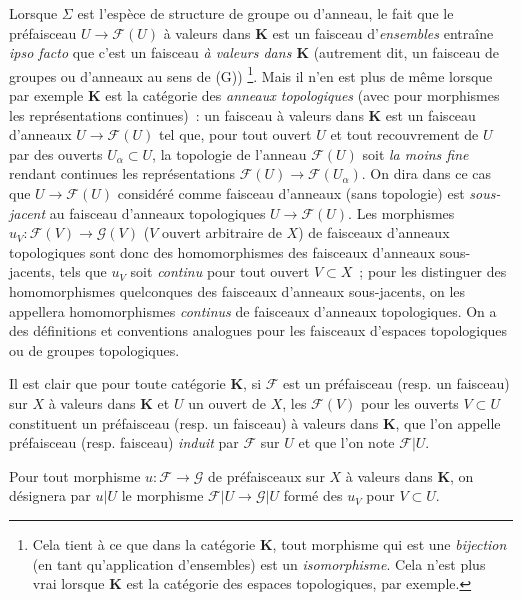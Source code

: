 \begin{env}[3.1.4]
\label{0.3.1.4-fr}
Lorsque $\Sigma$ est l'espèce de structure de groupe ou d'anneau, le fait que
le préfaisceau $U\to\mathcal{F}(U)$ à valeurs dans $\boldsymbol{K}$ est un
faisceau d'\emph{ensembles} entraîne \emph{ipso facto} que c'est un
faisceau \emph{à valeurs dans $\boldsymbol{K}$} (autrement dit, un faisceau de
groupes ou d'anneaux au sens de (G))%
\footnote{Cela tient à ce que dans la catégorie $\boldsymbol{K}$, tout morphisme
qui est une \emph{bijection} (en tant qu'application d'ensembles) est un
\emph{isomorphisme}. Cela n'est plus vrai lorsque $\boldsymbol{K}$ est la
catégorie des espaces topologiques, par exemple.}. Mais il n'en est plus de
même lorsque par exemple $\boldsymbol{K}$ est la catégorie des \emph{anneaux
topologiques} (avec pour morphismes les représentations continues)~: un
faisceau à valeurs dans $\boldsymbol{K}$ est un faisceau d'anneaux
$U\to\mathcal{F}(U)$ tel que, pour tout ouvert $U$ et tout recouvrement de $U$
par des ouverts $U_\alpha\subset U$, la topologie de l'anneau $\mathcal{F}(U)$
soit \emph{la moins fine} rendant continues les représentations
$\mathcal{F}(U)\to\mathcal{F}(U_\alpha)$. On dira dans ce cas que
$U\to\mathcal{F}(U)$ considéré comme faisceau d'anneaux (sans topologie) est
\emph{sous-jacent} au faisceau d'anneaux topologiques
$U\to\mathcal{F}(U)$. Les morphismes
$u_V:\mathcal{F}(V)\to\mathcal{G}(V)$ ($V$ ouvert arbitraire de $X$) de
faisceaux d'anneaux topologiques sont donc des homomorphismes des faisceaux
d'anneaux sous-jacents, tels que $u_V$ soit \emph{continu} pour tout ouvert
$V\subset X$~; pour les distinguer des homomorphismes quelconques des
faisceaux d'anneaux sous-jacents, on les appellera homomorphismes
\emph{continus} de faisceaux d'anneaux topologiques. On a des définitions et
conventions analogues pour les faisceaux d'espaces topologiques ou de groupes
topologiques.
\end{env}


\begin{env}[3.1.5]
\label{0.3.1.5-fr}
Il est clair que pour toute catégorie $\boldsymbol{K}$, si $\mathcal{F}$ est un
préfaisceau (resp. un faisceau) sur $X$ à valeurs dans $\boldsymbol{K}$ et $U$ un
ouvert de $X$, les $\mathcal{F}(V)$ pour les ouverts $V\subset U$ constituent
un préfaisceau (resp. un faisceau) à valeurs dans $\boldsymbol{K}$, que l'on
appelle préfaisceau (resp. faisceau) \emph{induit} par $\mathcal{F}$ sur $U$ et
que l'on note $\mathcal{F}|U$.

Pour tout morphisme $u:\mathcal{F}\to\mathcal{G}$ de préfaisceaux sur $X$ à
valeurs dans $\boldsymbol{K}$, on désignera par $u|U$ le morphisme
$\mathcal{F}|U\to\mathcal{G}|U$ formé des $u_V$ pour $V\subset U$.
\end{env}

